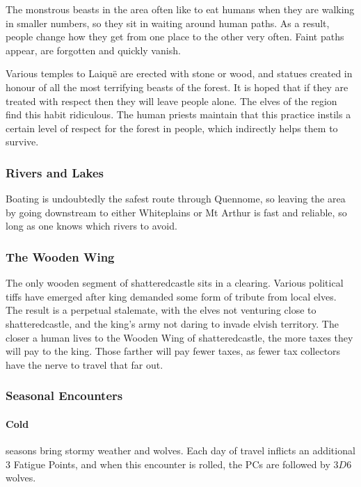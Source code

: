 \begin{multicols}{2}
The monstrous beasts in the area often like to eat humans when they are walking in smaller numbers, so they sit in waiting around human paths.
As a result, people change how they get from one place to the other very often.
Faint paths appear, are forgotten and quickly vanish.

Various temples to Laiqu\"{e} are erected with stone or wood, and statues created in honour of all the most terrifying beasts of the forest.  It is hoped that if they are treated with respect then they will leave people alone.
The elves of the region find this habit ridiculous.
The human priests maintain that this practice instils a certain level of respect for the forest in people, which indirectly helps them to survive.

\subsubsection{Rivers and Lakes}

Boating is undoubtedly the safest route through Quennome, so leaving the area by going downstream to either Whiteplains or Mt Arthur is fast and reliable, so long as one knows which rivers to avoid.

\subsubsection{The Wooden Wing}

The only wooden segment of \gls{shatteredcastle} sits in a clearing.
Various political tiffs have emerged after \gls{king} demanded some form of tribute from local elves.
The result is a perpetual stalemate, with the elves not venturing close to \gls{shatteredcastle}, and the king's army not daring to invade elvish territory.
The closer a human lives to the Wooden Wing of \gls{shatteredcastle}, the more taxes they will pay to the king.
Those farther will pay fewer taxes, as fewer tax collectors have the nerve to travel that far out.

\subsubsection{Seasonal Encounters}

\paragraph{Cold} seasons bring stormy weather and wolves.
Each day of travel inflicts an additional 3 Fatigue Points, and when this encounter is rolled, the PCs are followed by $3D6$ wolves.


\end{multicols}
